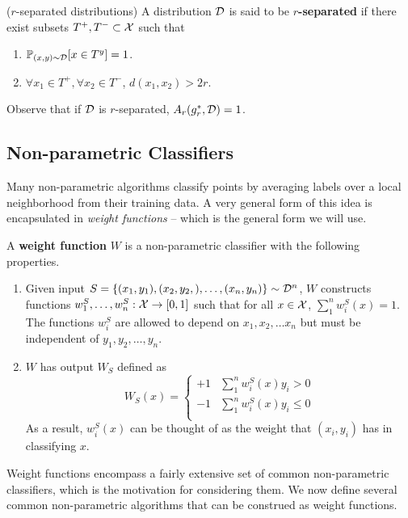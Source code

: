 \begin{defn}
($r$-separated distributions) A distribution ${\mathcal D}$ is said to be \textbf{$r$-separated} if there exist subsets $T^+, T^- \subset \mathcal X$ such that 
\begin{enumerate}
	\item $\mathbb{P}_{(x,y) \sim {\mathcal D}}[x \in T^y] = 1$. 
	\item $\forall x_1 \in T^+, \forall x_2 \in T^-$, $d(x_1, x_2) > 2r$.
\end{enumerate}
\end{defn}

Observe that if ${\mathcal D}$ is $r$-separated, $A_r(g^*_r, {\mathcal D}) = 1$.

\subsection{Non-parametric Classifiers}\label{classifiers}

Many non-parametric algorithms classify points by averaging labels over a local neighborhood from their training data. A very general form of this idea is encapsulated in \textit{weight functions} -- which is the general form we will use.

\begin{defn} \label{def:weight}
\cite{devroye96} A \textbf{weight function} $W$ is a non-parametric classifier with the following properties.
\begin{enumerate}
	\item Given input $S = \{(x_1, y_1), (x_2, y_2,), \dots, (x_n, y_n)\} \sim {\mathcal D}^n$, $W$ constructs functions $w_1^S, \dots, w_n^S: \mathcal X \to [0, 1]$ such that for all $x \in \mathcal X$, $\sum_1^n w_i^S(x) = 1$. The functions $w_i^S$ are allowed to depend on $x_1, x_2, \dots x_n$ but must be independent of $y_1, y_2, \dots, y_n$. 
	\item $W$ has output $W_S$ defined as \[ W_S(x) = \begin{cases} 
      +1 & \sum_1^n w_i^S(x)y_i > 0 \\
      -1 & \sum_1^n w_i^S(x)y_i \leq 0 \\
   \end{cases}
\]
As a result, $w_i^S(x)$ can be thought of as the weight that $(x_i, y_i)$ has in classifying $x$.
\end{enumerate}
\end{defn}

Weight functions encompass a fairly extensive set of common non-parametric classifiers, which is the motivation for considering them. We now define several common non-parametric algorithms that can be construed as weight functions. 

